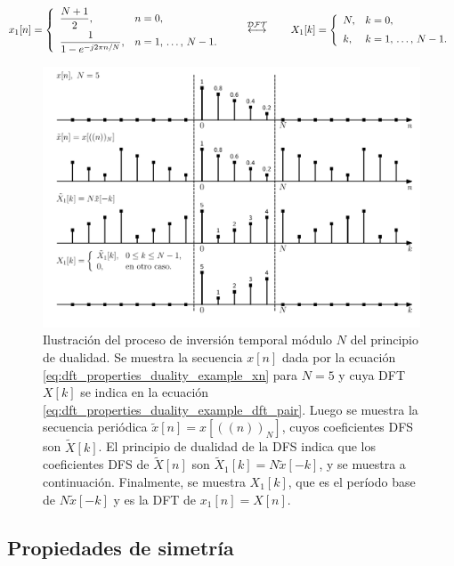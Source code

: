 \documentclass[a4paper]{report}
\begin{document}
\[
 x_1[n]=\left\{
 \begin{array}{ll}
  \dfrac{N+1}{2}, & n=0,\\[\medskipamount]
  \dfrac{1}{1-e^{-j2\pi n/N}}, & n=1,\,\dots,\,N-1.
 \end{array}
 \right.
 \qquad\overset{\mathcal{DFT}}{\longleftrightarrow}\qquad
 X_1[k]=\left\{
 \begin{array}{ll}
  N, & k=0,\\[\medskipamount]
  k, & k=1,\,\dots,\,N-1.
 \end{array}
 \right.
\]
\begin{figure}[!htb]
 \begin{center}
 \includegraphics[width=1\textwidth]{figuras/dft_properties_duality_example_reversion_modulo.pdf}
 \caption{\label{fig:dft_properties_duality_example_reversion_modulo} Ilustración del proceso de inversión temporal módulo \(N\) del principio de dualidad. Se muestra la secuencia \(x[n]\) dada por la ecuación \ref{eq:dft_properties_duality_example_xn} para \(N=5\) y cuya DFT \(X[k]\) se indica en la ecuación \ref{eq:dft_properties_duality_example_dft_pair}. Luego se muestra la secuencia periódica \(\tilde{x}[n]=x[((n))_N]\), cuyos coeficientes DFS son \(\tilde{X}[k]\). El principio de dualidad de la DFS indica que los coeficientes DFS de \(\tilde{X}[n]\) son \(\tilde{X}_1[k]=N\tilde{x}[-k]\), y se muestra a continuación. Finalmente, se muestra \(X_1[k]\), que es el período base de \(N\tilde{x}[-k]\) y es la DFT de \(x_1[n]=X[n]\).}
 \end{center}
\end{figure}

\subsection{Propiedades de simetría}\label{sec:dft_properties_symmetry}
\end{document}
